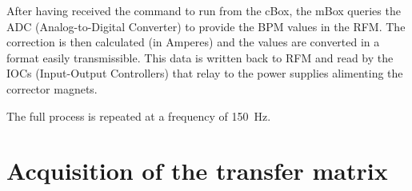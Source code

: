After having received the command to run from the cBox, the mBox queries the ADC (Analog-to-Digital Converter) to provide the BPM values in the RFM. The correction is then calculated (in Amperes) and the values are converted in a format easily transmissible. This data is written back to RFM and read by the IOCs (Input-Output Controllers) that relay to the power supplies alimenting the corrector magnets.

The full process is repeated at a frequency of 150~Hz. 

\section{Acquisition of the transfer matrix}
